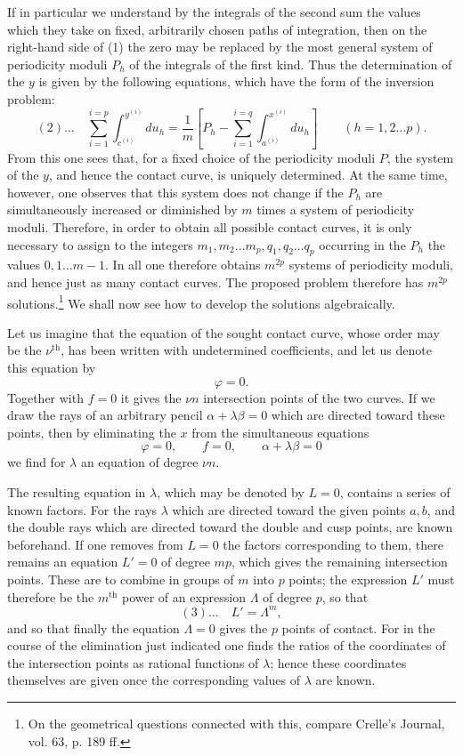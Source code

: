 \documentclass[10pt]{article}
\begin{document}
If in particular we understand by the integrals of the second sum the values which they take on fixed, arbitrarily chosen paths of integration, then on the right-hand side of (1) the zero may be replaced by the most general system of periodicity moduli \(P_h\) of the integrals of the first kind. Thus the determination of the \(y\) is given by the following equations, which have the form of the inversion problem:
\[
(2)\ldots\quad
\sum_{i=1}^{i=p}\int_{c^{(i)}}^{y^{(i)}}du_h
=
\frac{1}{m}\left[
P_h-\sum_{i=1}^{i=q}\int_{a^{(i)}}^{x^{(i)}}du_h
\right]\qquad(h=1,2\ldots p).
\]
From this one sees that, for a fixed choice of the periodicity moduli \(P\), the system of the \(y\), and hence the contact curve, is uniquely determined. At the same time, however, one observes that this system does not change if the \(P_h\) are simultaneously increased or diminished by \(m\) times a system of periodicity moduli. Therefore, in order to obtain all possible contact curves, it is only necessary to assign to the integers \(m_1,m_2\ldots m_p,q_1,q_2\ldots q_p\) occurring in the \(P_h\) the values \(0,1\ldots m-1\). In all one therefore obtains \(m^{2p}\) systems of periodicity moduli, and hence just as many contact curves. The proposed problem therefore has \(m^{2p}\) solutions.\footnote{On the geometrical questions connected with this, compare Crelle's Journal, vol. 63, p. 189 ff.} We shall now see how to develop the solutions algebraically.

Let us imagine that the equation of the sought contact curve, whose order may be the \(\nu^{\text{th}}\), has been written with undetermined coefficients, and let us denote this equation by
\[
\varphi=0.
\]
Together with \(f=0\) it gives the \(\nu n\) intersection points of the two curves. If we draw the rays of an arbitrary pencil \(\alpha+\lambda\beta=0\) which are directed toward these points, then by eliminating the \(x\) from the simultaneous equations
\[
\varphi=0,\qquad f=0,\qquad \alpha+\lambda\beta=0
\]
we find for \(\lambda\) an equation of degree \(\nu n\).

The resulting equation in \(\lambda\), which may be denoted by \(L=0\), contains a series of known factors. For the rays \(\lambda\) which are directed toward the given points \(a,b\), and the double rays which are directed toward the double and cusp points, are known beforehand. If one removes from \(L=0\) the factors corresponding to them, there remains an equation \(L'=0\) of degree \(mp\), which gives the remaining intersection points. These are to combine in groups of \(m\) into \(p\) points; the expression \(L'\) must therefore be the \(m^{\text{th}}\) power of an expression \(\Lambda\) of degree \(p\), so that
\[
(3)\ldots\quad L'=\Lambda^m,
\]
and so that finally the equation \(\Lambda=0\) gives the \(p\) points of contact. For in the course of the elimination just indicated one finds the ratios of the coordinates of the intersection points as rational functions of \(\lambda\); hence these coordinates themselves are given once the corresponding values of \(\lambda\) are known.
\end{document}
